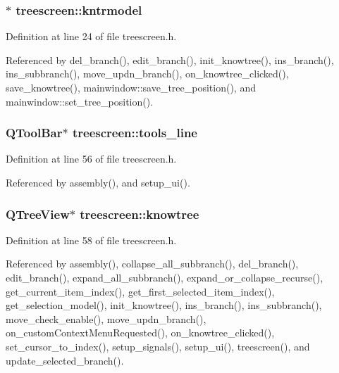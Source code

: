 \subsubsection{$\ast$ {\bf treescreen::kntrmodel}}\label{classtreescreen_9af96a0df5b4e075dd4fc01e0bd8e31d}




Definition at line 24 of file treescreen.h.

Referenced by del\_\-branch(), edit\_\-branch(), init\_\-knowtree(), ins\_\-branch(), ins\_\-subbranch(), move\_\-updn\_\-branch(), on\_\-knowtree\_\-clicked(), save\_\-knowtree(), mainwindow::save\_\-tree\_\-position(), and mainwindow::set\_\-tree\_\-position().
\subsubsection{\setlength{\rightskip}{0pt plus 5cm}QTool\-Bar$\ast$ {\bf treescreen::tools\_\-line}\hspace{0.3cm}{\tt  [private]}}\label{classtreescreen_4b1c78bd36c3ce2a67c4aa082320b2f9}




Definition at line 56 of file treescreen.h.

Referenced by assembly(), and setup\_\-ui().
\subsubsection{\setlength{\rightskip}{0pt plus 5cm}QTree\-View$\ast$ {\bf treescreen::knowtree}\hspace{0.3cm}{\tt  [private]}}\label{classtreescreen_784ae7066fc0dbbaea54f68ce648e3fe}




Definition at line 58 of file treescreen.h.

Referenced by assembly(), collapse\_\-all\_\-subbranch(), del\_\-branch(), edit\_\-branch(), expand\_\-all\_\-subbranch(), expand\_\-or\_\-collapse\_\-recurse(), get\_\-current\_\-item\_\-index(), get\_\-first\_\-selected\_\-item\_\-index(), get\_\-selection\_\-model(), init\_\-knowtree(), ins\_\-branch(), ins\_\-subbranch(), move\_\-check\_\-enable(), move\_\-updn\_\-branch(), on\_\-custom\-Context\-Menu\-Requested(), on\_\-knowtree\_\-clicked(), set\_\-cursor\_\-to\_\-index(), setup\_\-signals(), setup\_\-ui(), treescreen(), and update\_\-selected\_\-branch().
